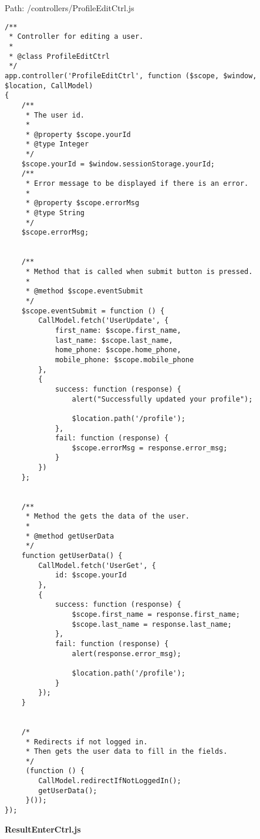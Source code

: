 Path: /controllers/ProfileEditCtrl.js
{\scriptsize
\begin{lstlisting}
/**
 * Controller for editing a user.
 *
 * @class ProfileEditCtrl
 */
app.controller('ProfileEditCtrl', function ($scope, $window, $location, CallModel)
{
	/**
	 * The user id.
	 *
	 * @property $scope.yourId
	 * @type Integer
	 */
	$scope.yourId = $window.sessionStorage.yourId;
	/**
	 * Error message to be displayed if there is an error.
	 *
	 * @property $scope.errorMsg
	 * @type String
	 */
	$scope.errorMsg;


	/**
	 * Method that is called when submit button is pressed.
	 *
	 * @method $scope.eventSubmit
	 */
	$scope.eventSubmit = function () {
		CallModel.fetch('UserUpdate', {
			first_name: $scope.first_name,
			last_name: $scope.last_name,
			home_phone: $scope.home_phone,
			mobile_phone: $scope.mobile_phone
		},
		{
			success: function (response) {
				alert("Successfully updated your profile");

				$location.path('/profile');
			},
			fail: function (response) {
				$scope.errorMsg = response.error_msg;
			}
		})
	};


	/**
	 * Method the gets the data of the user.
	 *
	 * @method getUserData
	 */
	function getUserData() {
		CallModel.fetch('UserGet', {
			id: $scope.yourId
		},
		{
			success: function (response) {
				$scope.first_name = response.first_name;
				$scope.last_name = response.last_name;
			},
			fail: function (response) {
				alert(response.error_msg);

				$location.path('/profile');
			}
		});
	}


	/*
	 * Redirects if not logged in.
	 * Then gets the user data to fill in the fields.
	 */
	 (function () {
	 	CallModel.redirectIfNotLoggedIn();
	 	getUserData();
	 }());
});\end{lstlisting}
}
\textbf{ResultEnterCtrl.js}\label{ResultEnterCtrl.js}

